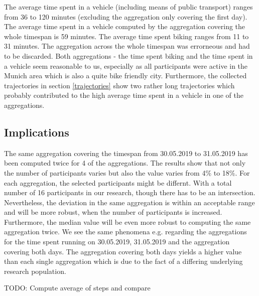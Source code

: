 The average time spent in a vehicle (including means of public transport) ranges from 36 to 120 minutes (excluding the aggregation only covering the first day). The average time spent in a vehicle computed by the aggregation covering the whole timespan is 59 minutes.
The average time spent biking ranges from 11 to 31 minutes. The aggregation across the whole timespan was errorneous and had to be discarded. Both aggregations - the time spent biking and the time spent in a vehicle seem reasonable to us, especially as all participants were active in the Munich area which is also a quite bike friendly city. Furthermore, the collected trajectories in section \ref{trajectories} show two rather long trajectories which probably contributed to the high average time spent in a vehicle in one of the aggregations.

\subsection{Implications}
The same aggregation covering the timespan from 30.05.2019 to 31.05.2019 has been computed twice for 4 of the aggregations. The results show that not only the number of participants varies but also the value varies from 4\% to 18\%. For each aggregation, the selected participants might be differnt. With a total number of 16 participants in our research, though there has to be an intersection. Nevertheless, the deviation in the same aggregation is within an acceptable range and will be more robust, when the number of participants is increased. Furthermore, the median value will be even more robust to computing the same aggregation twice. We see the same phenomena e.g. regarding the aggregations for the time spent running on 30.05.2019, 31.05.2019 and the aggregation covering both days. The aggregation covering both days yields a higher value than each single aggregation which is due to the fact of a differing underlying research population.

TODO: Compute average of steps and compare

